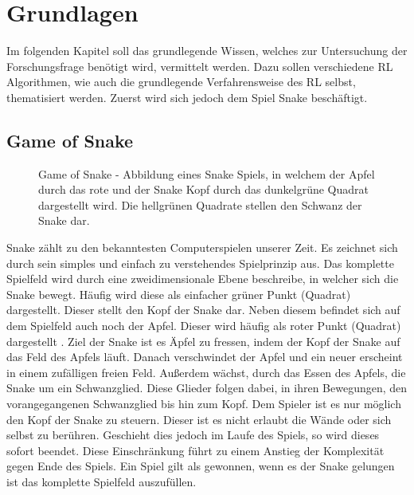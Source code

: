
\chapter{Grundlagen}\label{chap:Grundlagen}
Im folgenden Kapitel soll das grundlegende Wissen, welches zur Untersuchung der Forschungsfrage benötigt wird, vermittelt werden. Dazu sollen verschiedene RL Algorithmen, wie auch die grundlegende Verfahrensweise des RL selbst, thematisiert werden. Zuerst wird sich jedoch dem Spiel Snake beschäftigt. 

\section{Game of Snake} \label{sec:Grundlagen_Game_of_Snake}
\begin{figure}[H]
	\centering
	
	\caption[Game of Snake]{Game of Snake - Abbildung eines Snake Spiels, in welchem der Apfel durch das rote und der Snake Kopf durch das dunkelgrüne Quadrat dargestellt wird. Die hellgrünen Quadrate stellen den Schwanz der Snake dar.}
	\label{fig:Grundlagen_Game_of_Snake}
\end{figure}
Snake zählt zu den bekanntesten Computerspielen unserer Zeit. Es zeichnet sich durch sein simples und einfach zu verstehendes Spielprinzip aus.
Das komplette Spielfeld wird durch eine zweidimensionale Ebene beschreibe, in welcher sich die Snake bewegt. Häufig wird diese als einfacher grüner Punkt (Quadrat) dargestellt. Dieser stellt den Kopf der Snake dar. Neben diesem befindet sich auf dem Spielfeld auch noch der Apfel. Dieser wird häufig als roter Punkt (Quadrat) dargestellt .
Ziel der Snake ist es Äpfel zu fressen, indem der Kopf der Snake auf das Feld des Apfels läuft. Danach verschwindet der Apfel und ein neuer erscheint in einem zufälligen freien Feld. Außerdem wächst, durch das Essen des Apfels, die Snake um ein Schwanzglied. Diese Glieder folgen dabei, in ihren Bewegungen, den vorangegangenen Schwanzglied bis hin zum Kopf. Dem Spieler ist es nur möglich den Kopf der Snake zu steuern.
Dieser ist es nicht erlaubt die Wände oder sich selbst zu berühren. Geschieht dies jedoch im Laufe des Spiels, so wird dieses sofort beendet. Diese Einschränkung führt zu einem Anstieg der Komplexität gegen Ende des Spiels. 
Ein Spiel gilt als gewonnen, wenn es der Snake gelungen ist das komplette Spielfeld auszufüllen.

